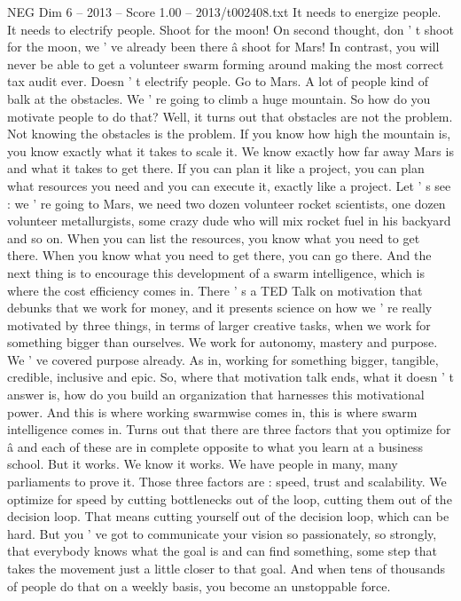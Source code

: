 \begin{textsample}{NEG Dim 6 – 2013 – Score 1.00 – 2013/t002408.txt}
It needs to energize people.
It needs to electrify people.
Shoot for the moon!
On second thought, don ' t shoot for the moon, we ' ve already been there â shoot for Mars!
In contrast, you will never be able to get a volunteer swarm forming around making the most correct tax audit ever.
Doesn ' t electrify people.
Go to Mars.
A lot of people kind of balk at the obstacles.
We ' re going to climb a huge mountain.
So how do you motivate people to do that?
Well, it turns out that obstacles are not the problem.
Not knowing the obstacles is the problem.
If you know how high the mountain is, you know exactly what it takes to scale it.
We know exactly how far away Mars is and what it takes to get there.
If you can plan it like a project, you can plan what resources you need and you can execute it, exactly like a project.
Let ' s see : we ' re going to Mars, we need two dozen volunteer rocket scientists, one dozen volunteer metallurgists, some crazy dude who will mix rocket fuel in his backyard and so on.
When you can list the resources, you know what you need to get there.
When you know what you need to get there, you can go there.
And the next thing is to encourage this development of a swarm intelligence, which is where the cost efficiency comes in.
There ' s a TED Talk on motivation that debunks that we work for money, and it presents science on how we ' re really motivated by three things, in terms of larger creative tasks, when we work for something bigger than ourselves.
We work for autonomy, mastery and purpose.
We ' ve covered purpose already.
As in, working for something bigger, tangible, credible, inclusive and epic.
So, where that motivation talk ends, what it doesn ' t answer is, how do you build an organization that harnesses this motivational power.
And this is where working swarmwise comes in, this is where swarm intelligence comes in.
Turns out that there are three factors that you optimize for â and each of these are in complete opposite to what you learn at a business school.
But it works.
We know it works.
We have people in many, many parliaments to prove it.
Those three factors are : speed, trust and scalability.
We optimize for speed by cutting bottlenecks out of the loop, cutting them out of the decision loop.
That means cutting yourself out of the decision loop, which can be hard.
But you ' ve got to communicate your vision so passionately, so strongly, that everybody knows what the goal is and can find something, some step that takes the movement just a little closer to that goal.
And when tens of thousands of people do that on a weekly basis, you become an unstoppable force.

\end{textsample}
